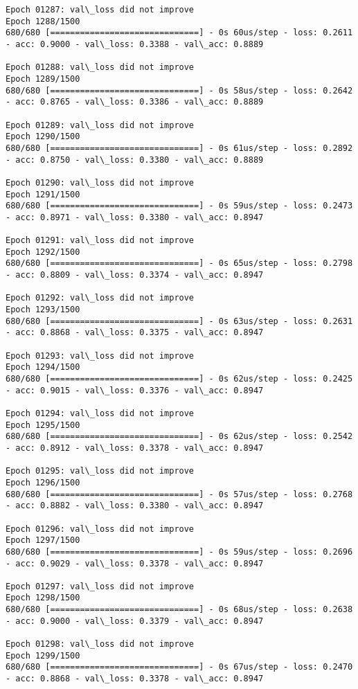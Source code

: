 \documentclass[11pt]{article}
\begin{document}
\begin{Verbatim}[commandchars=\\\{\}]
Epoch 01287: val\_loss did not improve
Epoch 1288/1500
680/680 [==============================] - 0s 60us/step - loss: 0.2611 - acc: 0.9000 - val\_loss: 0.3388 - val\_acc: 0.8889

Epoch 01288: val\_loss did not improve
Epoch 1289/1500
680/680 [==============================] - 0s 58us/step - loss: 0.2642 - acc: 0.8765 - val\_loss: 0.3386 - val\_acc: 0.8889

Epoch 01289: val\_loss did not improve
Epoch 1290/1500
680/680 [==============================] - 0s 61us/step - loss: 0.2892 - acc: 0.8750 - val\_loss: 0.3380 - val\_acc: 0.8889

Epoch 01290: val\_loss did not improve
Epoch 1291/1500
680/680 [==============================] - 0s 59us/step - loss: 0.2473 - acc: 0.8971 - val\_loss: 0.3380 - val\_acc: 0.8947

Epoch 01291: val\_loss did not improve
Epoch 1292/1500
680/680 [==============================] - 0s 65us/step - loss: 0.2798 - acc: 0.8809 - val\_loss: 0.3374 - val\_acc: 0.8947

Epoch 01292: val\_loss did not improve
Epoch 1293/1500
680/680 [==============================] - 0s 63us/step - loss: 0.2631 - acc: 0.8868 - val\_loss: 0.3375 - val\_acc: 0.8947

Epoch 01293: val\_loss did not improve
Epoch 1294/1500
680/680 [==============================] - 0s 62us/step - loss: 0.2425 - acc: 0.9015 - val\_loss: 0.3376 - val\_acc: 0.8947

Epoch 01294: val\_loss did not improve
Epoch 1295/1500
680/680 [==============================] - 0s 62us/step - loss: 0.2542 - acc: 0.8912 - val\_loss: 0.3378 - val\_acc: 0.8947

Epoch 01295: val\_loss did not improve
Epoch 1296/1500
680/680 [==============================] - 0s 57us/step - loss: 0.2768 - acc: 0.8882 - val\_loss: 0.3380 - val\_acc: 0.8947

Epoch 01296: val\_loss did not improve
Epoch 1297/1500
680/680 [==============================] - 0s 59us/step - loss: 0.2696 - acc: 0.9029 - val\_loss: 0.3378 - val\_acc: 0.8947

Epoch 01297: val\_loss did not improve
Epoch 1298/1500
680/680 [==============================] - 0s 68us/step - loss: 0.2638 - acc: 0.9000 - val\_loss: 0.3379 - val\_acc: 0.8947

Epoch 01298: val\_loss did not improve
Epoch 1299/1500
680/680 [==============================] - 0s 67us/step - loss: 0.2470 - acc: 0.8868 - val\_loss: 0.3378 - val\_acc: 0.8947


\end{Verbatim}
\end{document}
